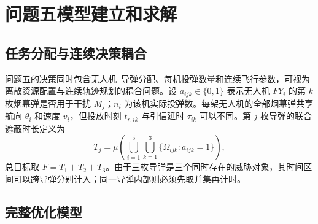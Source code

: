 \section{问题五模型建立和求解}

\subsection{任务分配与连续决策耦合}

问题五的决策同时包含无人机--导弹分配、每机投弹数量和连续飞行参数，可视为离散资源配置与连续轨迹规划的耦合问题\cite{dantzig1957discrete}。设 $a_{ijk}\in\{0,1\}$ 表示无人机 $FY_i$ 的第 $k$ 枚烟幕弹是否用于干扰 $M_j$；$n_i$ 为该机实际投弹数。每架无人机的全部烟幕弹共享航向 $\theta_i$ 和速度 $v_i$，但投放时刻 $t_{r,ik}$ 与引信延时 $\tau_{ik}$ 可以不同。第 $j$ 枚导弹的联合遮蔽时长定义为
\begin{equation}
 T_j=\mu\!\left(\bigcup_{i=1}^{5}\bigcup_{k=1}^{3}
 \{\Omega_{ijk}:a_{ijk}=1\}\right),
\end{equation}
总目标取 $F=T_1+T_2+T_3$。由于三枚导弹是三个同时存在的威胁对象，其时间区间可以跨导弹分别计入；同一导弹内部则必须先取并集再计时。

\subsection{完整优化模型}

